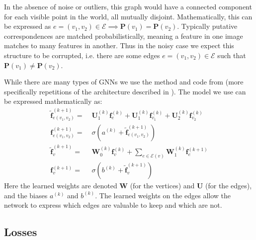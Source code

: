\documentclass[10pt,twocolumn,letterpaper]{article}
\newcommand{\mat}[1]{\mathbf{#1}}
\begin{document}
In the absence of noise or outliers, this graph would have a connected component for each visible point in the world, all mutually disjoint.
Mathematically, this can be expressed as $e = (v_1, v_2) \in \mathcal{E} \implies \mat{P}(v_1) = \mat{P}(v_2)$.
Typically putative correspondences are matched probabilistically, meaning a feature in one image matches to many features in another.
Thus in the noisy case we expect this structure to be corrupted, i.e. there are some edges $e = (v_1, v_2) \in \mathcal{E}$ such that $\mat{P}(v_1) \neq \mat{P}(v_2)$.

While there are many types of GNNs \cite{bronstein2017geometric, bruna2013spectral, defferrard2016convolutional, kipf2017semi, scarselli2009graph, gama2018mimo, gama2018convolutional} we use the method and code from \cite{battaglia2018relational} (more specifically repetitions of the architecture described in \cite{battaglia2016interaction}). 
The model we use can be expressed mathematically as:
\begin{align}
\mat{\tilde{f}}_{e(v_1,v_2)}^{(k+1)} =&\; \mat{U}_1^{(k)} \mat{f}_{e}^{(k)} + \mat{U}_1^{(k)} \mat{f}_{v_1}^{(k)} + \mat{U}_2^{(k)} \mat{f}_{v_2}^{(k)} \\
\mat{f}_{e(v_1,v_2)}^{(k+1)} =&\; \sigma \left(a^{(k)} + \mat{\tilde{f}}_{e(v_1,v_2)}^{(k+1)}\right) \\
\mat{\tilde{f}}_{v}^{(k+1)} =&\; \mat{W}_0^{(k)} \mat{f}_{v}^{(k)} + \sum_{e \in \mathcal{E}(v)} \mat{W}_1^{(k)} \mat{f}_{e}^{(k+1)} \\
\mat{f}_v^{(k+1)} =&\; \sigma\left(b^{(k)} + \mat{\tilde{f}}_v^{(k+1)}\right)
\end{align}
Here the learned weights are denoted $\mat{W}$ (for the vertices) and $\mat{U}$ (for the edges), and the biases $a^{(k)}$ and  $b^{(k)}$.
The learned weights on the edges allow the network to express which edges are valuable to keep and which are not.

\subsection{Losses}
\end{document}
